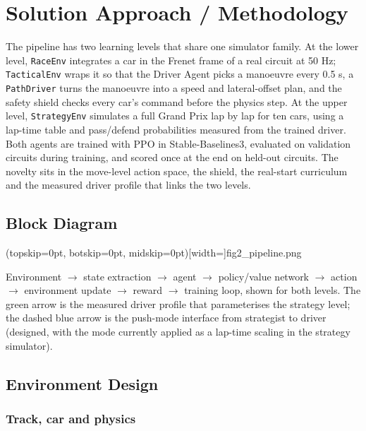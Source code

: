 \documentclass{ieeeaccess}
\begin{document}
\section{Solution Approach / Methodology}

The pipeline has two learning levels that share one simulator family. At the lower
level, \texttt{RaceEnv} integrates a car in the Frenet frame of a real circuit at 50 Hz;
\texttt{TacticalEnv} wraps it so that the Driver Agent picks a manoeuvre every 0.5 s, a
\texttt{PathDriver} turns the manoeuvre into a speed and lateral-offset plan, and the
safety shield checks every car's command before the physics step. At the upper
level, \texttt{StrategyEnv} simulates a full Grand Prix lap by lap for ten cars, using a
lap-time table and pass/defend probabilities measured from the trained driver.
Both agents are trained with PPO in Stable-Baselines3, evaluated on validation
circuits during training, and scored once at the end on held-out circuits. The
novelty sits in the move-level action space, the shield, the real-start curriculum
and the measured driver profile that links the two levels.

\subsection{Block Diagram}

\Figure[t!](topskip=0pt, botskip=0pt, midskip=0pt)[width=\textwidth]{fig2_pipeline.png}
{\parbox{0.92\textwidth}{Environment \ensuremath{\rightarrow} state extraction \ensuremath{\rightarrow} agent \ensuremath{\rightarrow} policy/value network \ensuremath{\rightarrow} action \ensuremath{\rightarrow} environment update \ensuremath{\rightarrow} reward \ensuremath{\rightarrow} training loop, shown for both levels. The green arrow is the measured driver profile that parameterises the strategy level; the dashed blue arrow is the push-mode interface from strategist to driver (designed, with the mode currently applied as a lap-time scaling in the strategy simulator).}\label{fig:fig2_pipeline}}

\subsection{Environment Design}

\subsubsection{Track, car and physics}
\end{document}
